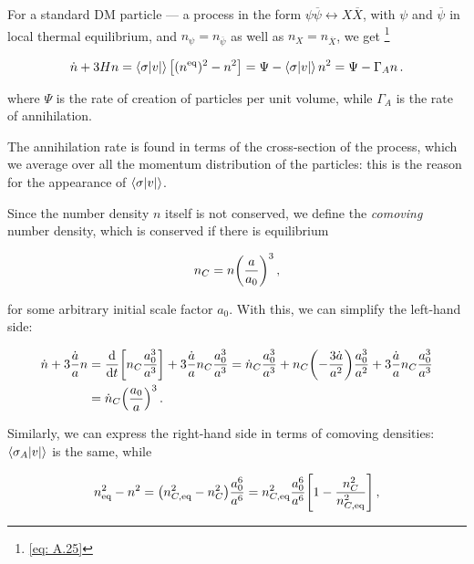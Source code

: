 \hspace{0.5cm}For a standard DM particle --- a process in the form \(\psi \overline{\psi} \leftrightarrow X \overline{X}\), with \(\psi \) and \(\overline{\psi }\) in local thermal equilibrium, and \(n_\psi = n_{\overline{\psi}}\) as well as \(n_X = n_{\overline{X}}\), we get \footnote{\ref{eq: A.25}}

\begin{align}
    \dot{n} + 3 H n = \expval{\sigma \abs{v}} \qty[ (n^{\text{eq}})^2 - n^2] = \Psi - \expval{\sigma \abs{v} } n^2 = \Psi - \Gamma_A n\,.
\end{align}

where \(\Psi \) is the rate of creation of particles per unit volume, while \(\Gamma_A\) is the rate of annihilation. 

The annihilation rate is found in terms of the cross-section of the process, which we average over all the momentum distribution of the particles: this is the reason for the appearance of \(\expval{\sigma \abs{v}}\).

Since the number density \(n\) itself is not conserved, we define the \emph{comoving} number density, which is conserved if there is equilibrium

\begin{align}
  n_C = n \qty(\frac{a}{a_0 })^3\,,
\end{align}

for some arbitrary initial scale factor \(a_0 \).
With this, we can simplify the left-hand side: 

\begin{align}
  \dot{n} + 3 \frac{\dot{a}}{a} n 
  &= \dv{}{t} \qty[n_C \frac{a_0^3}{a^3}] + 3 \frac{\dot{a}}{a} n_C \frac{a_0^3}{a^3} = \dot{n}_C \frac{a_0^3}{a^3} 
  + n_C \qty(-\frac{3 \dot{a}}{a^2}) \frac{a_0^3}{a^2}
  + 3 \frac{\dot{a}}{a} n_C \frac{a_0^3}{a^3}  \\
  &= \dot{n}_C \qty(\frac{a_0 }{a})^3
\,.
\end{align}

Similarly, we can express the right-hand side in terms of comoving densities: \(\expval{\sigma_A \abs{v}}\) is the same, while 

\begin{align}
    n _{\text{eq}}^2 - n^2 = \qty(n _{C, \text{eq}}^2 - n_C^2) \frac{a_0^{6}}{a^{6}} = n _{C, \text{eq}}^2 \frac{a_0^{6}}{a^{6}} \qty[1 - \frac{n_C^2}{n _{C, \text{eq}}^2}]\,,
\end{align}

